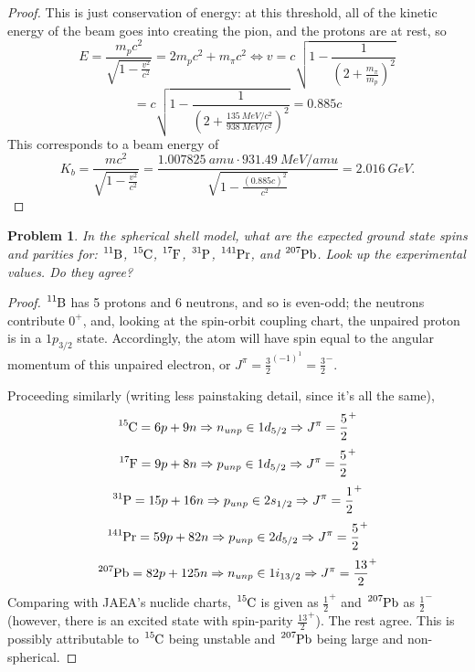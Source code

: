 \documentclass{article}
\newtheorem{plm}{Problem}
\begin{document}
\begin{proof}
  This is just conservation of energy: at this threshold, all of the kinetic energy of the beam goes into creating the pion,
  and the protons are at rest, so
  \[
    E = \frac{m_{p}c^{2}}{\sqrt{1 - \frac{v^{2}}{c^{2}}}} = 2m_{p}c^{2} + m_{\pi}c^{2}
    \Leftrightarrow v = c\sqrt{1 - \frac{1}{(2 + \frac{m_{\pi}}{m_{p}})^{2}}}
  \]
  \[
    = c \sqrt{1 - \frac{1}{(2 + \frac{\SI{135}{MeV/c^{2}}}{\SI{938}{MeV/c^{2}}})^{2}}} = 0.885c
  \]
  This corresponds to a beam energy of
  \[
    K_{b} = \frac{mc^{2}}{\sqrt{1 - \frac{v^{2}}{c^{2}}}}
    = \frac{\SI{1.007825}{amu} \cdot \SI{931.49}{MeV/amu}}{\sqrt{1 - \frac{(0.885c)^{2}}{c^{2}}}}
    = \SI{2.016}{GeV}.
  \]
\end{proof}

\begin{plm}
  In the spherical shell model, what are the expected ground state spins and parities for:
  $\ce{^{11}B}$, $\ce{^{15}C}$, $\ce{^{17}F}$, $\ce{^{31}P}$, $\ce{^{141}Pr}$, and $\ce{^{207}Pb}$.
  Look up the experimental values.
  Do they agree?
\end{plm}

\begin{proof}
  $\ce{^{11}B}$ has 5 protons and 6 neutrons, and so is even-odd; the neutrons contribute $0^{+}$, and, looking at the spin-orbit coupling chart,
  the unpaired proton is in a $1p_{3/2}$ state.
  Accordingly, the atom will have spin equal to the angular momentum of this unpaired electron, or $J^{\pi} = \frac{3}{2}^{(-1)^{1}}
  = \frac{3}{2}^{-}$.

  Proceeding similarly (writing less painstaking detail, since it's all the same),
  \[
    \ce{^{15}C} = 6p + 9n \Rightarrow n_{unp} \in 1d_{5/2} \Rightarrow J^{\pi} = \frac{5}{2}^{+}
  \]
  \[
    \ce{^{17}F} = 9p + 8n \Rightarrow p_{unp} \in 1d_{5/2} \Rightarrow J^{\pi} = \frac{5}{2}^{+}
  \]
  \[
    \ce{^{31}P} = 15p + 16n \Rightarrow p_{unp} \in 2s_{1/2} \Rightarrow J^{\pi} = \frac{1}{2}^{+}
  \]
  \[
    \ce{^{141}Pr} = 59p + 82n \Rightarrow p_{unp} \in 2d_{5/2} \Rightarrow J^{\pi} = \frac{5}{2}^{+}
  \]
  \[
    \ce{^{207}Pb} = 82p + 125n \Rightarrow n_{unp} \in 1i_{13/2} \Rightarrow J^{\pi} = \frac{13}{2}^{+}
  \]
  Comparing with JAEA's nuclide charts, $\ce{^{15}C}$ is given as $\frac{1}{2}^{+}$ and $\ce{^{207}Pb}$ as $\frac{1}{2}^{-}$
  (however, there is an excited state with spin-parity $\frac{13}{2}^{+}$).
  The rest agree.
  This is possibly attributable to $\ce{^{15}C}$ being unstable and $\ce{^{207}Pb}$ being large and non-spherical.
\end{proof}
\end{document}
